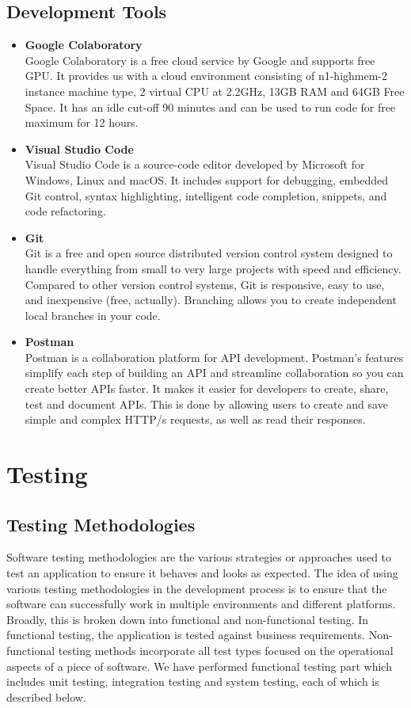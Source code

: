 \documentclass[11pt]{report}
\begin{document}
\section{Development Tools}
\begin{itemize}
    \item \textbf{Google Colaboratory} \\
    Google Colaboratory is a free cloud service by Google and supports free GPU. It provides us with a cloud environment consisting of n1-highmem-2 instance machine type, 2 virtual CPU at 2.2GHz, 13GB RAM and  64GB Free Space. It has an idle cut-off 90 minutes and can be used to run code for free maximum for 12 hours.
    \item \textbf{Visual Studio Code} \\
    Visual Studio Code is a source-code editor developed by Microsoft for Windows, Linux and macOS. It includes support for debugging, embedded Git control, syntax highlighting, intelligent code completion, snippets, and code refactoring.
    \item \textbf{Git} \\
    Git is a free and open source distributed version control system designed to handle everything from small to very large projects with speed and efficiency. Compared to other version control systems, Git is responsive, easy to use, and inexpensive (free, actually). Branching allows you to create independent local branches in your code.
    \pagebreak
    \item \textbf{Postman}\\
    Postman is a collaboration platform for API development. Postman's features simplify each step of building an API and streamline collaboration so you can create better APIs faster. It makes it easier for developers to create, share, test and document APIs. This is done by allowing users to create and save simple and complex HTTP/s requests, as well as read their responses.
\end{itemize}

\chapter{Testing}
\section{Testing Methodologies}
Software testing methodologies are the various strategies or approaches used to test an application to ensure it behaves and looks as expected. The idea of using various testing methodologies in the development process is to ensure that the software can successfully work in multiple environments and different platforms. Broadly, this is broken down into functional and non-functional testing. In functional testing, the application is tested against business requirements. Non-functional testing methods incorporate all test types focused on the operational aspects of a piece of software. We have performed functional testing part which includes unit testing, integration testing and system testing, each of which is described below.
\end{document}
